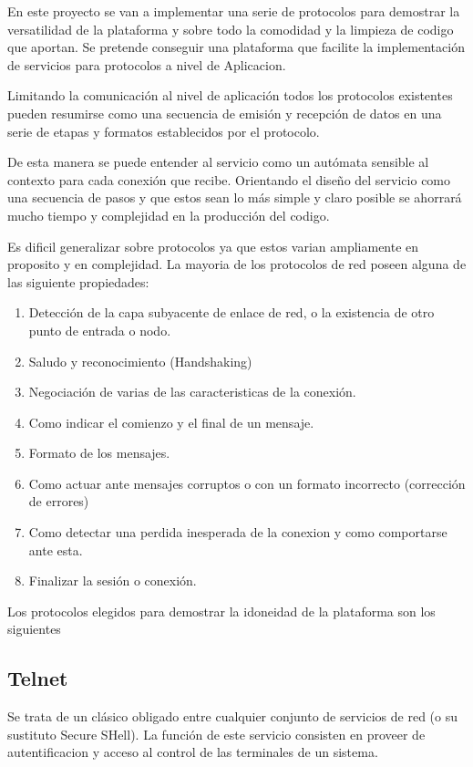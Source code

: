 \documentclass[a4paper,spanish,12pt]{book}
\begin{document}
En este proyecto se van a implementar una serie de protocolos para demostrar la versatilidad de la plataforma y sobre todo la comodidad y la limpieza de codigo que aportan. Se pretende conseguir una plataforma que facilite la implementación de servicios para protocolos a nivel de Aplicacion.

Limitando la comunicación al nivel de aplicación todos los protocolos existentes pueden resumirse como una secuencia de emisión y recepción de datos en una serie de etapas y formatos establecidos por el protocolo. 

De esta manera se puede entender al servicio como un autómata sensible al contexto para cada conexión que recibe. Orientando el diseño del servicio como una secuencia de pasos y que estos sean lo más simple y claro posible se ahorrará mucho tiempo y complejidad en la producción del codigo. 

Es dificil generalizar sobre protocolos ya que estos varian ampliamente en proposito y en complejidad. La mayoria de los protocolos de red poseen alguna de las siguiente propiedades:

\begin{enumerate}
\item Detección de la capa subyacente de enlace de red, o la existencia de otro punto de entrada o nodo.
\item Saludo y reconocimiento (Handshaking)
\item Negociación de varias de las caracteristicas de la conexión.
\item Como indicar el comienzo y el final de un mensaje.
\item Formato de los mensajes.
\item Como actuar ante mensajes corruptos o con un formato incorrecto (corrección de errores)
\item Como detectar una perdida inesperada de la conexion y como comportarse ante esta.
\item Finalizar la sesión o conexión.
\end{enumerate}

Los protocolos elegidos para demostrar la idoneidad de la plataforma son los siguientes


\subsection{Telnet}
Se trata de un cl\'asico obligado entre cualquier conjunto de servicios de red (o su sustituto Secure SHell). La función de este servicio consisten en proveer de autentificacion y acceso al control de las terminales de un sistema.
\end{document}
